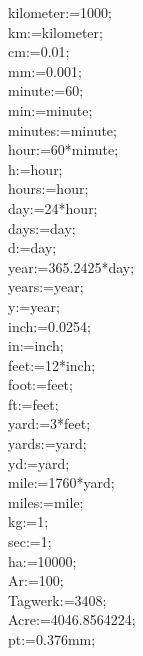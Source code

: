 \documentclass[a4paper,10pt]{article}
\begin{document}
\begin{eulernotebook}
\begin{eulercomment}
\begin{eulercomment}
\begin{eulercomment}
\begin{eulercomment}
\begin{eulercomment}
kilometer\textdollar{}:=1000;\\
km\textdollar{}:=kilometer\textdollar{};\\
cm\textdollar{}:=0.01;\\
mm\textdollar{}:=0.001;\\
minute\textdollar{}:=60;\\
min\textdollar{}:=minute\textdollar{};\\
minutes\textdollar{}:=minute\textdollar{};\\
hour\textdollar{}:=60*minute\textdollar{};\\
h\textdollar{}:=hour\textdollar{};\\
hours\textdollar{}:=hour\textdollar{};\\
day\textdollar{}:=24*hour\textdollar{};\\
days\textdollar{}:=day\textdollar{};\\
d\textdollar{}:=day\textdollar{};\\
year\textdollar{}:=365.2425*day\textdollar{};\\
years\textdollar{}:=year\textdollar{};\\
y\textdollar{}:=year\textdollar{};\\
inch\textdollar{}:=0.0254;\\
in\textdollar{}:=inch\textdollar{};\\
feet\textdollar{}:=12*inch\textdollar{};\\
foot\textdollar{}:=feet\textdollar{};\\
ft\textdollar{}:=feet\textdollar{};\\
yard\textdollar{}:=3*feet\textdollar{};\\
yards\textdollar{}:=yard\textdollar{};\\
yd\textdollar{}:=yard\textdollar{};\\
mile\textdollar{}:=1760*yard\textdollar{};\\
miles\textdollar{}:=mile\textdollar{};\\
kg\textdollar{}:=1;\\
sec\textdollar{}:=1;\\
ha\textdollar{}:=10000;\\
Ar\textdollar{}:=100;\\
Tagwerk\textdollar{}:=3408;\\
Acre\textdollar{}:=4046.8564224;\\
pt\textdollar{}:=0.376mm;


\end{eulercomment}
\end{eulercomment}
\end{eulercomment}
\end{eulercomment}
\end{eulercomment}
\end{eulernotebook}
\end{document}
